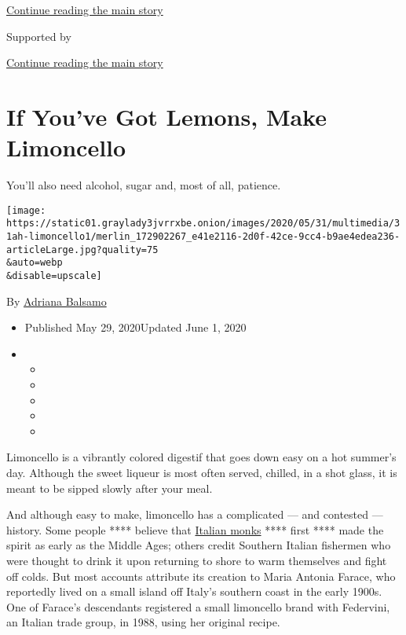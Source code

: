 \protect\hyperlink{after-top}{Continue reading the main story}

Supported by

\protect\hyperlink{after-sponsor}{Continue reading the main story}

\hypertarget{if-youve-got-lemons-make-limoncello}{%
\section{If You've Got Lemons, Make
Limoncello}\label{if-youve-got-lemons-make-limoncello}}

You'll also need alcohol, sugar and, most of all, patience.

\texttt{[image: https://static01.graylady3jvrrxbe.onion/images/2020/05/31/multimedia/31ah-limoncello1/merlin\_172902267\_e41e2116-2d0f-42ce-9cc4-b9ae4edea236-articleLarge.jpg?quality=75\\\&auto=webp\\\&disable=upscale]}

By \href{https://www.nytimes3xbfgragh.onion/by/adriana-balsamo}{Adriana
Balsamo}

\begin{itemize}
\item
  Published May 29, 2020Updated June 1, 2020
\item
  \begin{itemize}
  \item
  \item
  \item
  \item
  \item
  \end{itemize}
\end{itemize}

Limoncello is a vibrantly colored digestif that goes down easy on a hot
summer's day. Although the sweet liqueur is most often served, chilled,
in a shot glass, it is meant to be sipped slowly after your meal.

And although easy to make, limoncello has a complicated --- and
contested --- history. Some people **** believe that
\href{https://www.nytimes3xbfgragh.onion/2016/06/24/realestate/an-italian-retreat-with-a-monastic-past.html}{Italian
monks} **** first **** made the spirit as early as the Middle Ages;
others credit Southern Italian fishermen who were thought to drink it
upon returning to shore to warm themselves and fight off colds. But most
accounts attribute its creation to Maria Antonia Farace, who reportedly
lived on a small island off Italy's southern coast in the early 1900s.
One of Farace's descendants registered a small limoncello brand with
Federvini, an Italian trade group, in 1988, using her original recipe.

